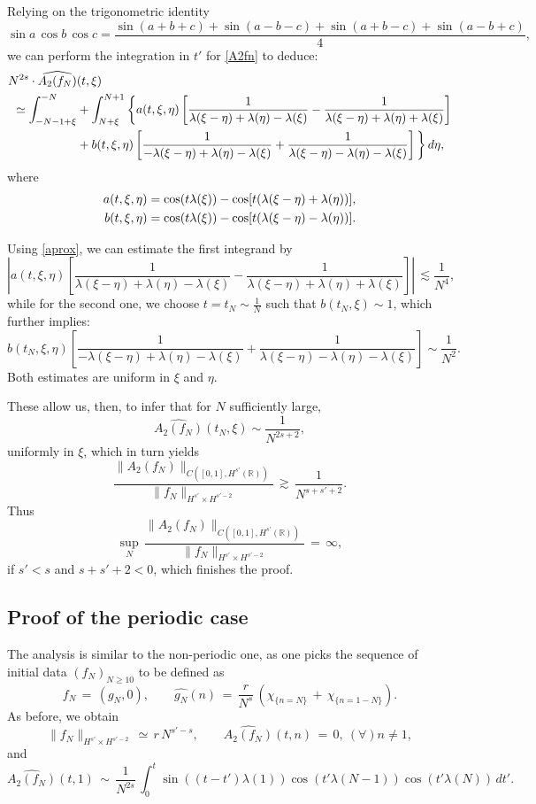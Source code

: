 \documentclass{amsart}
\begin{document}
Relying on the trigonometric identity
\[
\sin a\,\cos b\,\cos c=\frac{\sin (a+b+c)+\sin (a-b-c)+\sin (a+b-c)+\sin (a-b+c)}{4},
\]
we can perform the integration in $t'$ for \eqref{A2fn} to deduce:
\begin{equation}
\aligned
N^{2s}\cdot \widehat{A_2(f_N)}&(t,\xi)\\ 
\simeq  \int_{- N-1+\xi}^{-N} &+\int_{N+\xi}^{N+1} \bigg\{ a(t,\xi,\eta) \left[ \frac{1}{\lambda(\xi - \eta) + \lambda(\eta)- \lambda(\xi)} - \frac{1}{\lambda(\xi - \eta) + \lambda(\eta)+\lambda(\xi)} \right]\\
&+b(t,\xi,\eta) \left[ \frac{1}{-\lambda(\xi - \eta) + \lambda(\eta)-\lambda(\xi)} + \frac{1}{\lambda(\xi - \eta) - \lambda(\eta)-\lambda(\xi)} \right]\bigg\}\,d\eta,
\endaligned
\end{equation}
where
\begin{equation}\aligned
a(t,\xi,\eta)&= \cos (t\lambda(\xi))-\cos[t(\lambda(\xi - \eta) + \lambda(\eta))],\\ b(t,\xi,\eta)&= \cos (t\lambda(\xi))-\cos[t(\lambda(\xi - \eta) - \lambda(\eta))].
\endaligned
\end{equation}

Using \eqref{aprox}, we can estimate the first integrand by
\[
\left|a(t,\xi,\eta) \left[ \frac{1}{\lambda(\xi - \eta) + \lambda(\eta)- \lambda(\xi)} - \frac{1}{\lambda(\xi - \eta) + \lambda(\eta)+\lambda(\xi)} \right]\right|\,\lesssim \frac{1}{N^4}, 
\]
while for the second one, we choose $t=t_N \sim \frac{1}{N}$ such that $b(t_N,\xi) \sim 1$, which further implies:
\[
b(t_N,\xi,\eta) \left[ \frac{1}{-\lambda(\xi - \eta) + \lambda(\eta)-\lambda(\xi)} + \frac{1}{\lambda(\xi - \eta) - \lambda(\eta)-\lambda(\xi)} \right] \sim \frac{1}{N^2}.\]
Both estimates are uniform in $\xi$ and $\eta$.

These allow us, then, to infer that for $N$ sufficiently large,
\[
\widehat{A_2(f_N)}(t_N,\xi) \sim \frac{1}{N^{2s+2}},
\]
uniformly in $\xi$, which in turn yields
\[
\frac{\|A_2(f_N)\|_{C([0,1], H^{s'}(\mathbb{R}))}}{\|f_N\|_{H^{s'}\times H^{s'-2}}}\,\gtrsim\, \frac{1}{N^{s+s'+2}}.\]
Thus
\[
\sup_N\,\frac{\|A_2(f_N)\|_{C([0,1], H^{s'}(\mathbb{R}))}}{\|f_N\|_{H^{s'}\times H^{s'-2}}}\,=\,\infty,\]
if $s'<s$ and $s+s'+2<0$, which finishes the proof.

\subsection{Proof of the periodic case} The analysis is similar to the non-periodic one, as one picks the sequence of initial data $(f_N)_{N\geq 10}$ to be defined as
\begin{equation}
f_N\,=\,(g_N, 0), \qquad \widehat{g_N}(n)\,=\,\frac{r}{N^s} \,\left(\chi_{\{n=N\}}\,+\,\chi_{\{n=1-N\}}\right).
\label{fnp}
\end{equation}
As before, we obtain
\[
\|f_N\|_{H^{s'}\times H^{s'-2}}\,\simeq\,r\,N^{s'-s}, \qquad \widehat{A_2(f_N)}(t,n)\,=\,0, \ (\forall) n \neq 1,\]
and
\[
\widehat{A_2(f_N)}(t,1)\,\sim\,\frac{1}{N^{2s}}\,\int_0^t \sin((t-t') \lambda(1))\cos(t' \lambda(N-1))\cos(t'\lambda(N))\,dt'.
\]
\end{document}
